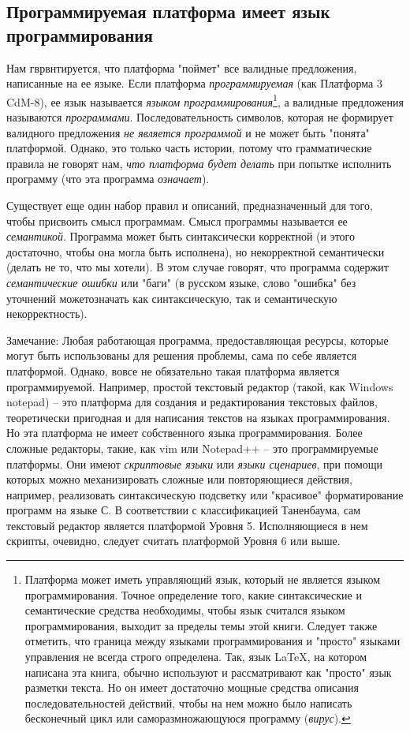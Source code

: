 \subsection{Программируемая платформа имеет язык программирования}

Нам гврвнтируется, что платформа "поймет" все валидные предложения, написанные на ее языке.  Если платформа \emph{программируемая} (как Платформа 3 CdM-8), ее язык называется \emph{языком программирования}\footnote{Платформа может иметь управляющий язык, который не является языком программирования.  Точное определение того, какие синтаксические и семантические средства необходимы, чтобы язык считался языком программирования, выходит за пределы темы этой книги. Следует также отметить, что граница между языками программирования и "просто" языками управления не всегда строго определена. Так, язык \LaTeX, на котором написана эта книга, обычно используют и рассматривают как "просто" язык разметки текста.  Но он имеет достаточно мощные средства описания последовательностей действий, чтобы на нем можно было написать бесконечный цикл или саморазмножающуюся программу (\emph{вирус}).}, а валидные предложения называются \emph{программами}.  Последовательность символов, которая не формирует валидного предложения  \emph{не является программой} и не может быть "понята" платформой.  Однако, это только часть истории, потому что грамматические правила не говорят нам, \emph{что платформа будет делать} при попытке исполнить программу (что эта программа \emph{означает}).

Существует еще один набор правил и описаний, предназначенный для того, чтобы присвоить смысл программам.  Смысл программы называется ее  \emph{семантикой}.  Программа может быть синтаксически корректной (и этого достаточно, чтобы она могла быть исполнена), но некорректной семантически (делать не то, что мы хотели).  В этом случае говорят, что программа содержит \emph{семантические ошибки} или "баги" (в русском языке, слово "ошибка" без уточнений можетозначать как синтаксическую, так и семантическую некорректность).

Замечание: Любая работающая программа, предоставляющая ресурсы, которые могут быть использованы для решения проблемы, сама по себе является платформой.  Однако, вовсе не обязательно такая платформа является программируемой.  Например, простой текстовый редактор (такой, как Windows notepad) -- это платформа для создания и редактирования текстовых файлов, теоретически пригодная и для написания текстов на языках программирования.  Но эта платформа не имеет  собственного языка программирования.  Более сложные редакторы, такие, как  vim или Notepad++ -- это программируемые платформы.  Они имеют \emph{скриптовые языки} или \emph{языки сценариев}, при помощи которых можно механизировать сложные или повторяющиеся действия, например, реализовать синтаксическую подсветку или "красивое" форматирование программ на языке С.  В соответствии с классификацией Таненбаума, сам текстовый редактор является платформой Уровня 5.  Исполняющиеся в нем скрипты, очевидно, следует считать платформой Уровня 6 или выше.

